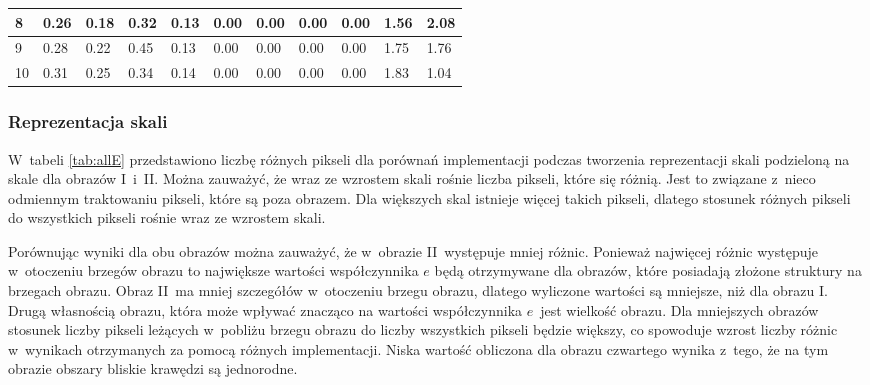 {\begin{landscape}
\begin{table}[h]
\begin{tabular}{|p{0.8cm}|p{2cm}|p{2cm}|p{2cm}|p{2cm}|p{2cm}|p{2cm}|p{2cm}|p{2cm}|p{2cm}|p{2cm}|}
8        & 0.26                          & 0.18                           & 0.32              & 0.13             & 0.00                & 0.00                 & 0.00                  & 0.00                   & 1.56              & 2.08             \\ \hline
9        & 0.28                          & 0.22                           & 0.45              & 0.13             & 0.00                & 0.00                 & 0.00                  & 0.00                   & 1.75              & 1.76             \\ \hline
10       & 0.31                          & 0.25                           & 0.34              & 0.14             & 0.00                & 0.00                 & 0.00                  & 0.00                   & 1.83              & 1.04             \\ \hline
\end{tabular}
\end{table}
\end{landscape}}

\subsubsection{Reprezentacja skali}
\label{subsubsec:reprezentacjaSakliTabele}

W~tabeli \ref{tab:allE} przedstawiono liczbę różnych pikseli dla porównań implementacji podczas tworzenia reprezentacji skali podzieloną na skale dla obrazów I~i~II. Można zauważyć, że wraz ze wzrostem skali rośnie liczba pikseli, które się różnią. Jest to związane z~nieco odmiennym traktowaniu pikseli, które są poza obrazem. Dla większych skal istnieje więcej takich pikseli, dlatego stosunek różnych pikseli do wszystkich pikseli rośnie wraz ze wzrostem skali.

Porównując wyniki dla obu obrazów można zauważyć, że w~obrazie II~występuje mniej różnic. Ponieważ najwięcej różnic występuje w~otoczeniu brzegów obrazu to największe wartości współczynnika $ e $ będą otrzymywane dla obrazów, które posiadają złożone struktury na brzegach obrazu. Obraz II~ma mniej szczegółów w~otoczeniu brzegu obrazu, dlatego wyliczone wartości są mniejsze, niż dla obrazu I. Drugą własnością obrazu, która może wpływać znacząco na wartości współczynnika $ e $~jest wielkość obrazu. Dla mniejszych obrazów stosunek liczby pikseli leżących w~pobliżu brzegu obrazu do liczby wszystkich pikseli będzie większy, co spowoduje wzrost liczby różnic w~wynikach otrzymanych za pomocą różnych implementacji. Niska wartość obliczona dla obrazu czwartego wynika z~tego, że na tym obrazie obszary bliskie krawędzi są jednorodne.

